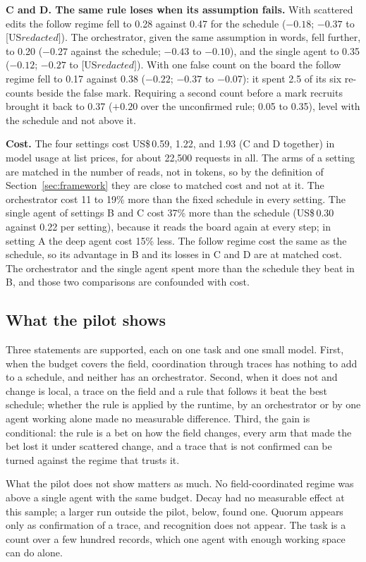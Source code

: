 \documentclass[10pt,twocolumn]{article}
\begin{document}
\textbf{C and D. The same rule loses when its assumption fails.} With scattered edits the follow regime fell to 0.28 against 0.47 for the schedule ($-0.18$; $-0.37$ to [US$ redacted]$). The orchestrator, given the same assumption in words, fell further, to 0.20 ($-0.27$ against the schedule; $-0.43$ to $-0.10$), and the single agent to 0.35 ($-0.12$; $-0.27$ to [US$ redacted]$). With one false count on the board the follow regime fell to 0.17 against 0.38 ($-0.22$; $-0.37$ to $-0.07$): it spent 2.5 of its six re-counts beside the false mark. Requiring a second count before a mark recruits brought it back to 0.37 ($+0.20$ over the unconfirmed rule; 0.05 to 0.35), level with the schedule and not above it.

\textbf{Cost.} The four settings cost US\$\,0.59, 1.22, and 1.93 (C and D together) in model usage at list prices, for about 22,500 requests in all. The arms of a setting are matched in the number of reads, not in tokens, so by the definition of Section~\ref{sec:framework} they are close to matched cost and not at it. The orchestrator cost 11 to 19\% more than the fixed schedule in every setting. The single agent of settings B and C cost 37\% more than the schedule (US\$\,0.30 against 0.22 per setting), because it reads the board again at every step; in setting A the deep agent cost 15\% less. The follow regime cost the same as the schedule, so its advantage in B and its losses in C and D are at matched cost. The orchestrator and the single agent spent more than the schedule they beat in B, and those two comparisons are confounded with cost.

\subsection{What the pilot shows}

Three statements are supported, each on one task and one small model. First, when the budget covers the field, coordination through traces has nothing to add to a schedule, and neither has an orchestrator. Second, when it does not and change is local, a trace on the field and a rule that follows it beat the best schedule; whether the rule is applied by the runtime, by an orchestrator or by one agent working alone made no measurable difference. Third, the gain is conditional: the rule is a bet on how the field changes, every arm that made the bet lost it under scattered change, and a trace that is not confirmed can be turned against the regime that trusts it.

What the pilot does not show matters as much. No field-coordinated regime was above a single agent with the same budget. Decay had no measurable effect at this sample; a larger run outside the pilot, below, found one. Quorum appears only as confirmation of a trace, and recognition does not appear. The task is a count over a few hundred records, which one agent with enough working space can do alone.
\end{document}
